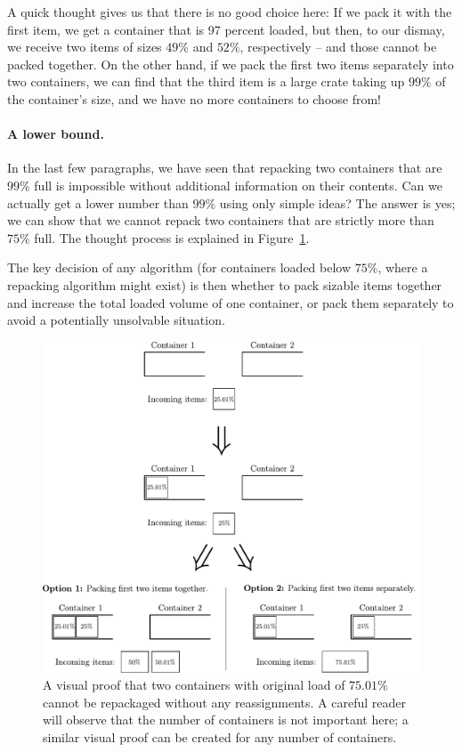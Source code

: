 A quick thought gives us that there is no good choice here: If we pack
it with the first item, we get a container that is 97 percent loaded,
but then, to our dismay, we receive two items of sizes $49\%$ and
$52\%$, respectively -- and those cannot be packed together. On the
other hand, if we pack the first two items separately into two
containers, we can find that the third item is a large crate taking up
$99\%$ of the container's size, and we have no more containers to
choose from!

\paragraph{A lower bound.} In the last few paragraphs, we have seen
that repacking two containers that are $99\%$ full is impossible
without additional information on their contents. Can we actually get
a lower number than $99\%$ using only simple ideas? The answer is yes;
we can show that we cannot repack two containers that are strictly
more than $75\%$ full. The thought process is explained in Figure~\ref{fig:example-lowerbound}.

The key decision of any algorithm (for containers loaded below $75\%$,
where a repacking algorithm might exist) is then whether to pack
sizable items together and increase the total loaded volume of one
container, or pack them separately to avoid a potentially unsolvable
situation.

\begin{figure}[th]
\begin{center}
\includegraphics[width=\textwidth]{img/example-lowerbound.pdf}
\end{center}
\caption[A visual proof that two containers with original load of $75.01\%$ cannot
be repackaged without any reassignments.]{A visual proof that two containers with original load of $75.01\%$ cannot
be repackaged without any reassignments. A careful reader will observe that the number
of containers is not important here; a similar visual proof can be created for any
number of containers.}
\label{fig:example-lowerbound}
\end{figure}


